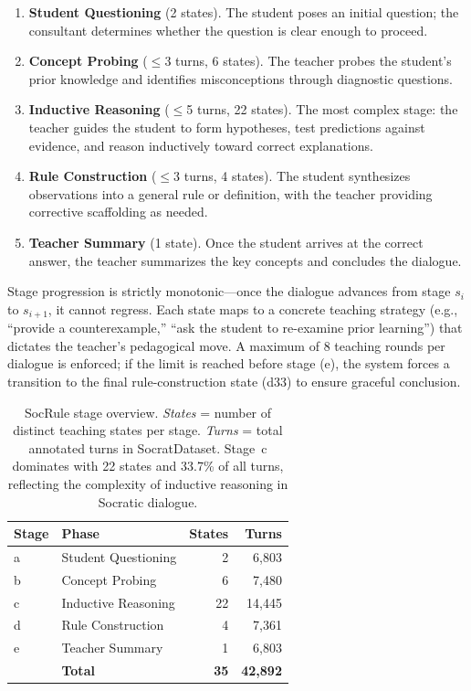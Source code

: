 \documentclass[11pt]{article}
\begin{document}
\begin{enumerate}
    \item[\textbf{(a)}] \textbf{Student Questioning} (2 states). The student poses an initial question; the consultant determines whether the question is clear enough to proceed.
    \item[\textbf{(b)}] \textbf{Concept Probing} ($\leq$3 turns, 6 states). The teacher probes the student's prior knowledge and identifies misconceptions through diagnostic questions.
    \item[\textbf{(c)}] \textbf{Inductive Reasoning} ($\leq$5 turns, 22 states). The most complex stage: the teacher guides the student to form hypotheses, test predictions against evidence, and reason inductively toward correct explanations.
    \item[\textbf{(d)}] \textbf{Rule Construction} ($\leq$3 turns, 4 states). The student synthesizes observations into a general rule or definition, with the teacher providing corrective scaffolding as needed.
    \item[\textbf{(e)}] \textbf{Teacher Summary} (1 state). Once the student arrives at the correct answer, the teacher summarizes the key concepts and concludes the dialogue.
\end{enumerate}

Stage progression is strictly monotonic---once the dialogue advances from stage $s_i$ to $s_{i+1}$, it cannot regress. Each state maps to a concrete teaching strategy (e.g., ``provide a counterexample,'' ``ask the student to re-examine prior learning'') that dictates the teacher's pedagogical move. A maximum of 8 teaching rounds per dialogue is enforced; if the limit is reached before stage (e), the system forces a transition to the final rule-construction state (d33) to ensure graceful conclusion.

\begin{table}[t]
  \centering
  \small
  \begin{tabular}{@{}llrr@{}}
    \toprule
    \textbf{Stage} & \textbf{Phase} & \textbf{States} & \textbf{Turns} \\
    \midrule
    a & Student Questioning    & 2  & 6{,}803 \\
    b & Concept Probing        & 6  & 7{,}480 \\
    c & Inductive Reasoning    & 22 & 14{,}445 \\
    d & Rule Construction      & 4  & 7{,}361 \\
    e & Teacher Summary        & 1  & 6{,}803 \\
    \midrule
      & \textbf{Total}         & \textbf{35} & \textbf{42{,}892} \\
    \bottomrule
  \end{tabular}
  \caption{SocRule stage overview. \emph{States} = number of distinct teaching states per stage. \emph{Turns} = total annotated turns in SocratDataset. Stage~c dominates with 22 states and 33.7\% of all turns, reflecting the complexity of inductive reasoning in Socratic dialogue.}
  \label{tab:socrule}
\end{table}
\end{document}
